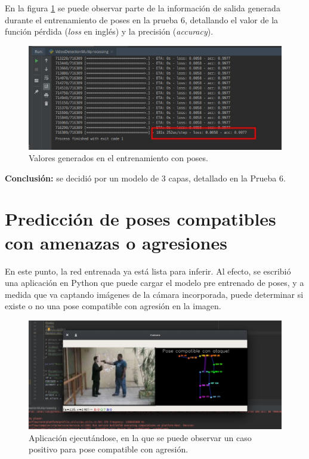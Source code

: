 \documentclass[a4paper,12pt,oneside,spanish]{book}
\begin{document}
En la figura \ref{fig:results2} se puede observar parte de la información de salida generada durante el entrenamiento de poses en la prueba 6, detallando  el valor de la función pérdida (\textit{loss} en inglés) y la precisión (\textit{accuracy}).

\begin{figure}[h!]
	\includegraphics[width=340pt]{Imagenes/results2.jpg}
	\centering	
	\caption{Valores generados en el entrenamiento con poses.}
	\label{fig:results2}
\end{figure}

\textbf{Conclusión:} se decidió por un modelo de 3 capas, detallado en la Prueba 6.

\section{Predicción de poses compatibles con amenazas o agresiones}\label{prediccion}
En este punto, la red entrenada ya está lista para inferir. Al efecto, se escribió una aplicación en Python que puede cargar el modelo pre entrenado de poses, y a medida que va captando imágenes de la cámara incorporada, puede determinar si existe o no una pose compatible con agresión en la imagen.\par


\begin{figure}[h!]
	\includegraphics[width=450pt]{Imagenes/output1.jpg}
	\centering	
	\caption{Aplicación ejecutándose, en la que se puede observar un caso positivo para pose compatible con agresión.}
	\label{fig:output1}
\end{figure}
\end{document}
